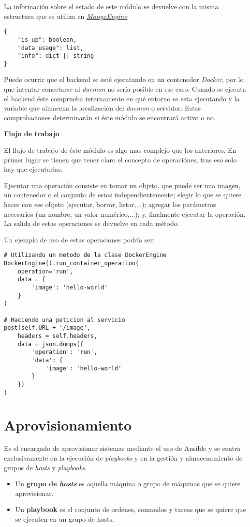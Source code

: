\bigskip
La información sobre el estado de este módulo se devuelve con la misma estructura que se utiliza en \hyperref[sec:mongoengine]{\textit{MongoEngine}}:
\begin{lstlisting}
{
	"is_up": boolean,
	"data_usage": list,
	"info": dict || string
}
\end{lstlisting}



\bigskip
Puede ocurrir que el backend se esté ejecutando en un contenedor \textit{Docker}, por lo que intentar conectarse al \textit{daemon} no sería posible en ese caso. Cuando se ejecuta el backend éste comprueba internamente en qué entorno se esta ejecutando y la variable que almacena la localización del \textit{daemon} o servidor. Estas comprobaciones determinarán si éste módulo se encontrará activo o no.


\bigskip
\textbf{Flujo de trabajo}

El flujo de trabajo de éste módulo es algo mas complejo que los anteriores. En primer lugar se tienen que tener claro el concepto de operaciónes, tras eso solo hay que ejecutarlas.

Ejecutar una operación consiste en tomar un objeto, que puede ser una imagen, un contenedor o el conjunto de estos independientemente; elegir lo que se quiere hacer con ese objeto (ejecutar, borrar, listar,...); agregar los parámetros necesarios (un nombre, un valor numérico,...); y, finalmente ejecutar la operación. La salida de estas operaciones se devuelve en cada método.

\smallskip
Un ejemplo de uso de estas operaciones podría ser:

\begin{lstlisting}
# Utilizando un metodo de la clase DockerEngine
DockerEngine().run_container_operation(
	operation='run',
	data = {
		'image': 'hello-world'
	}
)

# Haciendo una peticion al servicio
post(self.URL + '/image',
	headers = self.headers,
	data = json.dumps({
		'operation': 'run',
		'data': {
			'image': 'hello-world'
		}
	})
)
\end{lstlisting}


\section{Aprovisionamiento}


Es el encargado de aprovisionar sistemas mediante el uso de Ansible y se centra exclusivamente en la ejecución de \textit{playbooks} y en la gestión y almacenamiento de grupos de \textit{hosts} y \textit{playbooks}.
\begin{itemize}
	\item Un \textbf{grupo de \textit{hosts}} es aquella máquina o grupo de máquinas que se quiere aprovisionar.
	\item Un \textbf{playbook} es el conjunto de ordenes, comandos y tareas que se quiere que se ejecuten en un grupo de hosts.
\end{itemize}

